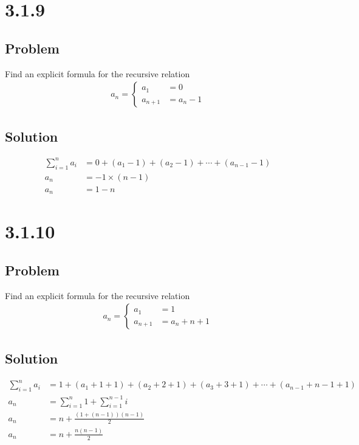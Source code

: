 \documentclass[12pt]{article}
\begin{document}
\section*{3.1.9}

\subsection*{Problem}
Find an explicit formula for the recursive relation
\begin{align*}
    a_n = \begin{cases}
        a_1 &= 0 \\
        a_{n + 1} &= a_n - 1
    \end{cases}
\end{align*}

\subsection*{Solution}
\begin{align*}
    \sum_{i = 1}^n a_i &= 0 + (a_1 - 1) + (a_2 - 1) + \cdots + (a_{n - 1} - 1) \\
    a_n &= -1 \times (n - 1) \\
    a_n &= 1 - n
\end{align*}



\section*{3.1.10}

\subsection*{Problem}
Find an explicit formula for the recursive relation
\begin{align*}
    a_n = \begin{cases}
        a_1 &= 1 \\
        a_{n + 1} &= a_n + n + 1
    \end{cases}
\end{align*}

\subsection*{Solution}
\begin{align*}
    \sum_{i = 1}^n a_i &= 1 + (a_1 + 1 + 1) + (a_2 + 2 + 1) + (a_3 + 3 + 1) + \cdots + (a_{n - 1} + n - 1 + 1) \\
    a_n &= \sum_{i = 1}^n 1 + \sum_{i = 1}^{n - 1} i \\
    a_n &= n + \frac{(1 + (n - 1)) (n - 1)}{2} \\
    a_n &= n + \frac{n(n - 1)}{2}
\end{align*}
\end{document}
